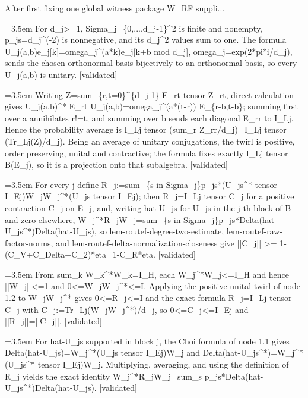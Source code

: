 \documentclass{article}
\newcommand{\step}[1]{\par\noindent\hangindent=3.5em\hangafter=1%
  \makebox[3.5em][l]{\textbf{#1.}}}
\newcommand{\steptag}[1]{\hfill{\small\textsf{[#1]}}}
\begin{document}
\begin{proofbox}{After first fixing one global witness package W\_RF suppli...}
\step{1.2.1} For d\_j>=1, Sigma\_j=\{0,...,d\_j-1\}\textasciicircum{}2 is finite and nonempty, p\_js=d\_j\textasciicircum{}(-2) is nonnegative, and its d\_j\textasciicircum{}2 values sum to one. The formula U\_j(a,b)e\_j[k]=omega\_j\textasciicircum{}(a*k)e\_j[k+b mod d\_j], omega\_j=exp(2*pi*i/d\_j), sends the chosen orthonormal basis bijectively to an orthonormal basis, so every U\_j(a,b) is unitary. \steptag{validated} \\[4pt]
\step{1.2.2} Writing Z=sum\_\{r,t=0\}\textasciicircum{}\{d\_j-1\} E\_rt tensor Z\_rt, direct calculation gives U\_j(a,b)\textasciicircum{}* E\_rt U\_j(a,b)=omega\_j\textasciicircum{}(a*(t-r)) E\_\{r-b,t-b\}; summing first over a annihilates r!=t, and summing over b sends each diagonal E\_rr to I\_Lj. Hence the probability average is I\_Lj tensor (sum\_r Z\_rr/d\_j)=I\_Lj tensor (Tr\_Lj(Z)/d\_j). Being an average of unitary conjugations, the twirl is positive, order preserving, unital and contractive; the formula fixes exactly I\_Lj tensor B(E\_j), so it is a projection onto that subalgebra. \steptag{validated} \\[4pt]
\step{1.3} For every j define R\_j:=sum\_\{s in Sigma\_j\}p\_js*(U\_js\textasciicircum{}* tensor I\_Ej)W\_jW\_j\textasciicircum{}*(U\_js tensor I\_Ej); then R\_j=I\_Lj tensor C\_j for a positive contraction C\_j on E\_j, and, writing hat-U\_js for U\_js in the j-th block of B and zero elsewhere, W\_j\textasciicircum{}*R\_jW\_j=sum\_\{s in Sigma\_j\}p\_js*Delta(hat-U\_js\textasciicircum{}*)Delta(hat-U\_js), so lem-routef-degree-two-estimate, lem-routef-raw-factor-norms, and lem-routef-delta-normalization-closeness give ||C\_j|| >= 1-(C\_V+C\_Delta+C\_2)*eta=1-C\_R*eta. \steptag{validated} \\[6pt]
\step{1.3.1} From sum\_k W\_k\textasciicircum{}*W\_k=I\_H, each W\_j\textasciicircum{}*W\_j<=I\_H and hence ||W\_j||<=1 and 0<=W\_jW\_j\textasciicircum{}*<=I. Applying the positive unital twirl of node 1.2 to W\_jW\_j\textasciicircum{}* gives 0<=R\_j<=I and the exact formula R\_j=I\_Lj tensor C\_j with C\_j:=Tr\_Lj(W\_jW\_j\textasciicircum{}*)/d\_j, so 0<=C\_j<=I\_Ej and ||R\_j||=||C\_j||. \steptag{validated} \\[4pt]
\step{1.3.2} For hat-U\_js supported in block j, the Choi formula of node 1.1 gives Delta(hat-U\_js)=W\_j\textasciicircum{}*(U\_js tensor I\_Ej)W\_j and Delta(hat-U\_js\textasciicircum{}*)=W\_j\textasciicircum{}*(U\_js\textasciicircum{}* tensor I\_Ej)W\_j. Multiplying, averaging, and using the definition of R\_j yields the exact identity W\_j\textasciicircum{}*R\_jW\_j=sum\_s p\_js*Delta(hat-U\_js\textasciicircum{}*)Delta(hat-U\_js). \steptag{validated} \\[4pt]

\end{proofbox}
\end{document}
